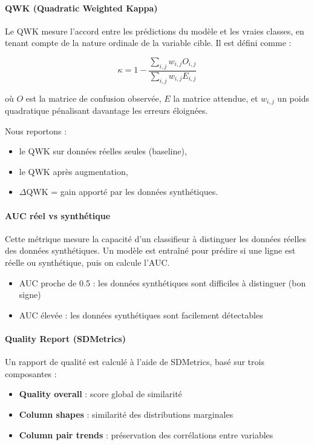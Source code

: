 \documentclass[conference]{IEEEtran}
\begin{document}
\paragraph{QWK (Quadratic Weighted Kappa)}

Le QWK mesure l’accord entre les prédictions du modèle et les vraies classes, en tenant compte de la nature ordinale de la variable cible. Il est défini comme :

\[
\kappa = 1 - \frac{\sum_{i,j} w_{i,j} O_{i,j}}{\sum_{i,j} w_{i,j} E_{i,j}}
\]

où $O$ est la matrice de confusion observée, $E$ la matrice attendue, et $w_{i,j}$ un poids quadratique pénalisant davantage les erreurs éloignées.

Nous reportons :
\begin{itemize}
    \item le QWK sur données réelles seules (baseline),
    \item le QWK après augmentation,
    \item $\Delta$QWK = gain apporté par les données synthétiques.\\
\end{itemize}

\paragraph{AUC réel vs synthétique}

Cette métrique mesure la capacité d’un classifieur à distinguer les données réelles des données synthétiques. Un modèle est entraîné pour prédire si une ligne est réelle ou synthétique, puis on calcule l’AUC.

\begin{itemize}
    \item AUC proche de 0.5 : les données synthétiques sont difficiles à distinguer (bon signe)
    \item AUC élevée : les données synthétiques sont facilement détectables \\
\end{itemize}

\paragraph{Quality Report (SDMetrics)}

Un rapport de qualité est calculé à l’aide de SDMetrics, basé sur trois composantes :

\begin{itemize}
    \item \textbf{Quality overall} : score global de similarité
    \item \textbf{Column shapes} : similarité des distributions marginales
    \item \textbf{Column pair trends} : préservation des corrélations entre variables
\end{itemize}
\end{document}
